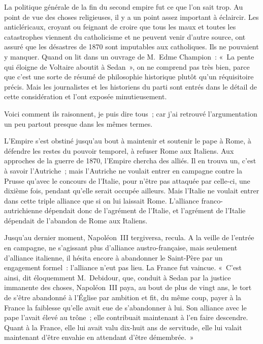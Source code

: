 \documentclass[french,twoside]{book} %
\newcommand{\astertri}{\medskip\par\centerline{\color{rubric}\large\selectfont{\syms ✻\,✻\,✻}}\medskip\par}%
\begin{document}
\astertri

\noindent La politique générale de la fin du second empire fut ce que l’on sait trop. Au point de vue des choses religieuses, il y a un point assez important à éclaircir. Les anticléricaux, croyant ou feignant de croire que tous les maux et toutes les catastrophes viennent du catholicisme et ne peuvent venir d’autre source, ont assuré que les désastres de 1870 sont imputables aux catholiques. Ils ne pouvaient y manquer. Quand on lit dans un ouvrage de M. Edme Champion : « La pente qui éloigne de Voltaire aboutit à Sedan », on ne comprend pas très bien, parce que c’est une sorte de résumé de philosophie historique plutôt qu’un réquisitoire précis. Mais les journalistes et les historiens du parti sont entrés dans le détail de cette considération et l’ont exposée minutieusement.\par
Voici comment ils raisonnent, je puis dire tous ;  car j’ai retrouvé l’argumentation un peu partout presque dans les mêmes termes.\par
L’Empire s’est obstiné jusqu’au bout à maintenir et soutenir le pape à Rome, à défendre les restes du pouvoir temporel, à refuser Rome aux Italiens. Aux approches de la guerre de 1870, l’Empire chercha des alliés. Il en trouva un, c’est à savoir l’Autriche ; mais l’Autriche ne voulait entrer en campagne contre la Prusse qu’avec le concours de l’Italie, pour n’être pas attaquée par celle-ci, une dixième fois, pendant qu’elle serait occupée ailleurs. Mais l’Italie ne voulait entrer dans cette triple alliance que si on lui laissait Rome. L’alliance franco-autrichienne dépendait donc de l’agrément de l’Italie, et l’agrément de l’Italie dépendait de l’abandon de Rome aux Italiens.\par
Jusqu’au dernier moment, Napoléon III tergiversa, recula. A la veille de l’entrée en campagne, ne s’agissant plus d’alliance austro-française, mais seulement d’alliance italienne, il hésita encore à abandonner le Saint-Père par un engagement formel : l’alliance n’eut pas lieu. La France fut vaincue. « C’est ainsi, dit éloquemment M. Debidour, que, conduit à Sedan par la justice immanente des choses, Napoléon III paya, au bout de plus de vingt ans, le tort de s’être abandonné à l’Église par ambition et fit, du même coup, payer à la France la  faiblesse qu’elle avait eue de s’abandonner à lui. Son alliance avec le pape l’avait élevé au trône ; elle contribuait maintenant à l’en faire descendre. Quant à la France, elle lui avait valu dix-huit ans de servitude, elle lui valait maintenant d’être envahie en attendant d’être démembrée. »\par
\end{document}
